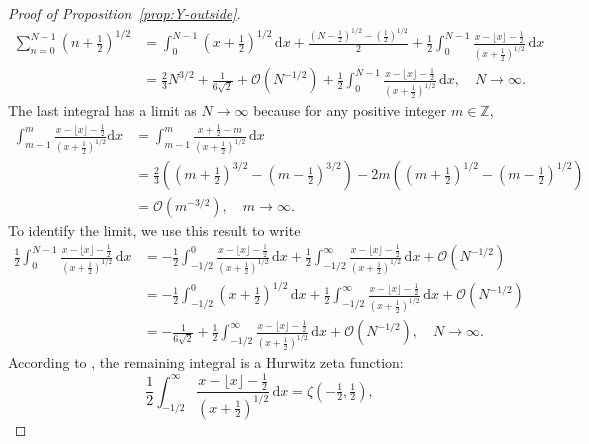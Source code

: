 \documentclass[12pt]{amsart}
\numberwithin{equation}{section}
\newcommand{\dd}{\mathrm{d}}
\newcommand{\bigo}[1]{ \mathcal{O}\! \left( #1 \right) }
\begin{document}
\begin{proof}[Proof of Proposition~\ref{prop:Y-outside}]
\begin{equation}
\begin{split}
\sum_{n=0}^{N-1}(n+\tfrac{1}{2})^{1/2}&=\int_0^{N-1}(x+\tfrac{1}{2})^{1/2}\,\dd x +\frac{(N-\tfrac{1}{2})^{1/2}-(\tfrac{1}{2})^{1/2}}{2}+\frac{1}{2}\int_0^{N-1}\frac{x-\lfloor x\rfloor-\tfrac{1}{2}}{(x+\tfrac{1}{2})^{1/2}}\,\dd x\\
&=\tfrac{2}{3}N^{3/2}+\frac{1}{6\sqrt{2}}+\bigo{N^{-1/2}}+\frac{1}{2}\int_0^{N-1}\frac{x-\lfloor x\rfloor-\tfrac{1}{2}}{(x+\tfrac{1}{2})^{1/2}}\,\dd x ,\quad N\to\infty.
\end{split}
\label{eq:sum-of-square-roots}
\end{equation}
The last integral has a limit as $N\to\infty$ because for any positive integer $m\in\mathbb{Z}$,
\begin{equation}
\begin{split}
\int_{m-1}^m\frac{x-\lfloor x\rfloor -\tfrac{1}{2}}{(x+\tfrac{1}{2})^{1/2}}\dd x &= \int_{m-1}^m\frac{x+\tfrac{1}{2}-m}{(x+\tfrac{1}{2})^{1/2}}\,\dd x \\ 
&= \tfrac{2}{3}\left((m+\tfrac{1}{2})^{3/2}-(m-\tfrac{1}{2})^{3/2}\right)-2m\left((m+\tfrac{1}{2})^{1/2}-(m-\tfrac{1}{2})^{1/2}\right)\\
&=\bigo{m^{-3/2}},\quad m\to\infty.
\end{split}
\end{equation}
To identify the limit, we use this result to write
\begin{equation}
\begin{split}
\frac{1}{2}\int_0^{N-1}\frac{x-\lfloor x\rfloor-\tfrac{1}{2}}{(x+\tfrac{1}{2})^{1/2}}\,\dd x&=- \frac{1}{2}\int_{-1/2}^0\frac{x-\lfloor x\rfloor-\tfrac{1}{2}}{(x+\tfrac{1}{2})^{1/2}}\,\dd x+\frac{1}{2}\int_{-1/2}^{\infty}\frac{x-\lfloor x\rfloor-\tfrac{1}{2}}{(x+\tfrac{1}{2})^{1/2}}\,\dd x +\bigo{N^{-1/2}}\\
&=-\frac{1}{2}\int_{-1/2}^0(x+\tfrac{1}{2})^{1/2}\,\dd x +\frac{1}{2}\int_{-1/2}^{\infty}\frac{x-\lfloor x\rfloor-\tfrac{1}{2}}{(x+\tfrac{1}{2})^{1/2}}\,\dd x+\bigo{N^{-1/2}}\\
&=-\frac{1}{6\sqrt{2}}+\frac{1}{2}\int_{-1/2}^{\infty}\frac{x-\lfloor x\rfloor-\tfrac{1}{2}}{(x+\tfrac{1}{2})^{1/2}}\,\dd x+\bigo{N^{-1/2}}
,\quad N\to\infty.
\end{split}
\label{eq:sawtooth-integral}
\end{equation}
According to \cite[25.11.26]{DLMF}, the remaining integral is a Hurwitz zeta function:
\begin{equation}
\frac{1}{2}\int_{-1/2}^{\infty}\frac{x-\lfloor x\rfloor-\tfrac{1}{2}}{(x+\tfrac{1}{2})^{1/2}}\,\dd x=\zeta(-\tfrac{1}{2},\tfrac{1}{2}),

\end{equation}
\end{proof}
\end{document}
